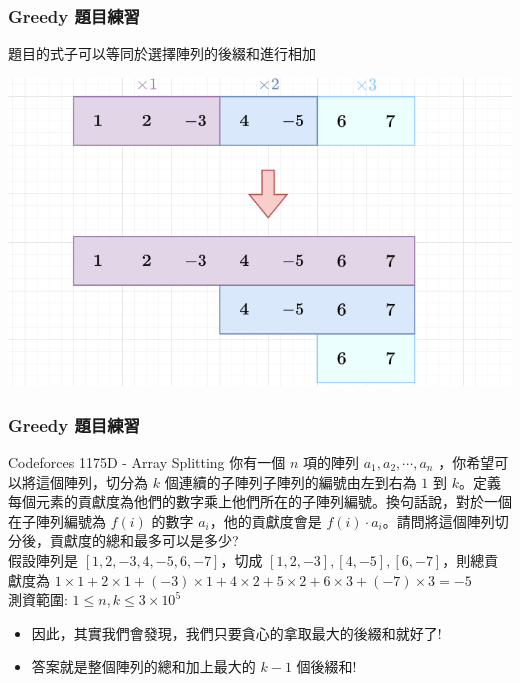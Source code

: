 \documentclass[aspectratio=169]{beamer}
\begin{document}
\begin{frame}
\frametitle{Greedy 題目練習}
    題目的式子可以等同於選擇陣列的後綴和進行相加
    \begin{center}
        \includegraphics[scale=0.5]{images/array_splitting.png}
    \end{center}
\end{frame}

\begin{frame}
\frametitle{Greedy 題目練習}
    \begin{block}{Codeforces 1175D - Array Splitting}
        你有一個 $n$ 項的陣列 $a_1, a_2, \cdots,a_n$ ，你希望可以將這個陣列，切分為 $k$ 個連續的子陣列子陣列的編號由左到右為 $1$ 到 $k$。定義每個元素的貢獻度為他們的數字乘上他們所在的子陣列編號。換句話說，對於一個在子陣列編號為 $f(i)$ 的數字 $a_i$，他的貢獻度會是 $f(i) \cdot a_i$。請問將這個陣列切分後，貢獻度的總和最多可以是多少? \\
        \vspace{5mm}
        假設陣列是 $[1,2,-3,4,-5,6,-7]$，切成 $[1,2,-3],[4,-5],[6,-7]$，則總貢獻度為 $1 \times 1 + 2 \times 1 + (-3) \times 1 + 4 \times 2 + 5 \times 2 + 6 \times 3 + (-7) \times 3 = -5$ \\
        \vspace{5mm}
        測資範圍: $1 \le n,k \le 3 \times 10^5$
    \end{block}
    \begin{itemize}
        \item<1-> 因此，其實我們會發現，我們只要貪心的拿取最大的後綴和就好了!
        \item<2-> 答案就是整個陣列的總和加上最大的 $k-1$ 個後綴和!
    \end{itemize}
\end{frame}
\end{document}
